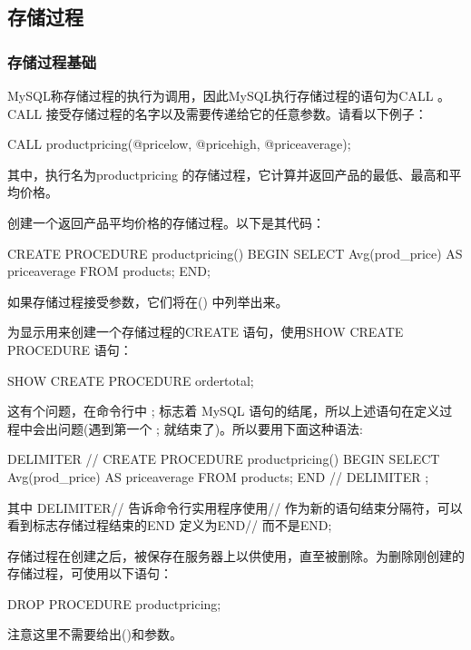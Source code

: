 \subsection{存储过程}

\subsubsection{存储过程基础}

MySQL称存储过程的执行为调用，因此MySQL执行存储过程的语句为CALL 。CALL 接受存储过程的名字以及需要传递给它的任意参数。请看以下例子：

\begin{sql}
CALL productpricing(@pricelow, @pricehigh, @priceaverage);
\end{sql}

其中，执行名为productpricing 的存储过程，它计算并返回产品的最低、最高和平均价格。

创建一个返回产品平均价格的存储过程。以下是其代码：

\begin{sql}
CREATE PROCEDURE productpricing()
BEGIN
   SELECT Avg(prod_price) AS priceaverage
   FROM products;
END;
\end{sql}

如果存储过程接受参数，它们将在() 中列举出来。

为显示用来创建一个存储过程的CREATE 语句，使用SHOW CREATE PROCEDURE 语句：

\begin{sql}
SHOW CREATE PROCEDURE ordertotal;
\end{sql}

这有个问题，在命令行中 ; 标志着 MySQL 语句的结尾，所以上述语句在定义过程中会出问题(遇到第一个 ; 就结束了)。所以要用下面这种语法:

\begin{sql}
DELIMITER //
CREATE PROCEDURE productpricing()
BEGIN
   SELECT Avg(prod_price) AS priceaverage
   FROM products;
END //
DELIMITER ;
\end{sql}

其中 DELIMITER// 告诉命令行实用程序使用// 作为新的语句结束分隔符，可以看到标志存储过程结束的END 定义为END// 而不是END; 

存储过程在创建之后，被保存在服务器上以供使用，直至被删除。为删除刚创建的存储过程，可使用以下语句：

\begin{sql}
DROP PROCEDURE productpricing;
\end{sql}

注意这里不需要给出()和参数。

